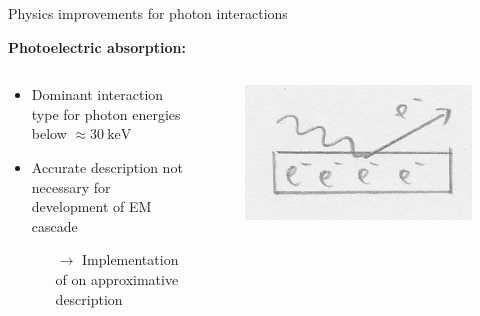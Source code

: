 \documentclass[t]{beamer}
\begin{document}
  \begin{columns}[onlytextwidth]%
    \begin{column}{\textwidth}%
      \begin{block}{Physics improvements for photon interactions}%
        \begin{minipage}[t]{0.3\textwidth}
          \begin{minipage}[t][12cm]{\textwidth}
            {\Large\textbf{Photoelectric absorption:}}
            \begin{columns}[onlytextwidth]
                \begin{column}{0.6\textwidth}%
                  \begin{itemize}[leftmargin=0.5cm]
                    \item Dominant interaction type for photon energies below $\approx \SI{30}{\kilo\electronvolt}$
                    \item Accurate description not necessary for development of EM cascade
                    \begin{itemize}
                      \item[$\rightarrow$] Implementation of on approximative description
                    \end{itemize}
                  \end{itemize}
                \end{column}
                \begin{column}{0.35\textwidth}%
                  \begin{figure}
                      \includegraphics[width=\linewidth, keepaspectratio]{images/photoeffect_sketch.png}
                    \end{figure}
                \end{column}

\end{columns}
\end{minipage}
\end{minipage}
\end{block}
\end{column}
\end{columns}
\end{document}
